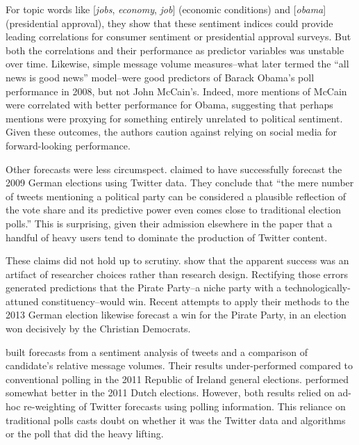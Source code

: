 \documentclass{article}
\begin{document}
For topic words like [\textit{jobs}, \textit{economy}, \textit{job}]
(economic conditions) and [\textit{obama}] (presidential approval),
they show that these sentiment indices could provide leading
correlations for consumer sentiment or presidential approval
surveys. But both the correlations and their performance as predictor
variables was unstable over time. Likewise, simple message volume
measures--what \citep{digrazia2013} later termed the ``all news is
good news'' model--were good predictors of Barack Obama's poll
performance in 2008, but not John McCain's. Indeed, more mentions of
McCain were correlated with better performance for Obama, suggesting
that perhaps mentions were proxying for something entirely unrelated
to political sentiment. Given these
outcomes, the authors caution against relying on social media for
forward-looking performance.

Other forecasts were less circumspect. \cite{tumasjan2010election}
claimed to have successfully forecast the 2009 German elections using
Twitter data. They conclude that ``the mere number of tweets
mentioning a political party can be considered a plausible reflection
of the vote share and its predictive power even comes close to
traditional election polls.'' This is surprising, given their
admission elsewhere in the paper that a handful of heavy users tend to
dominate the production of Twitter content. 

These claims did not hold up to scrutiny.
\cite{jungherr2012pirate} show that the apparent success was an
artifact of researcher choices rather than research design. Rectifying
those errors generated predictions that the Pirate Party--a niche
party with a technologically-attuned constituency--would win. Recent
attempts to apply their methods to the 2013 German election likewise
forecast a win for the Pirate Party, in an election won decisively by
the Christian Democrats.

\cite{bermingham2011using} built forecasts from a sentiment analysis
of tweets and a comparison of candidate's relative message
volumes. Their results under-performed compared to conventional
polling in the 2011 Republic of Ireland general
elections. \cite{sang2012predicting} performed somewhat better in the
2011 Dutch elections. However, both results relied on ad-hoc
re-weighting of Twitter forecasts using polling information. This
reliance on traditional polls casts doubt on whether it was the
Twitter data and algorithms or the poll that did the heavy lifting.
\end{document}
